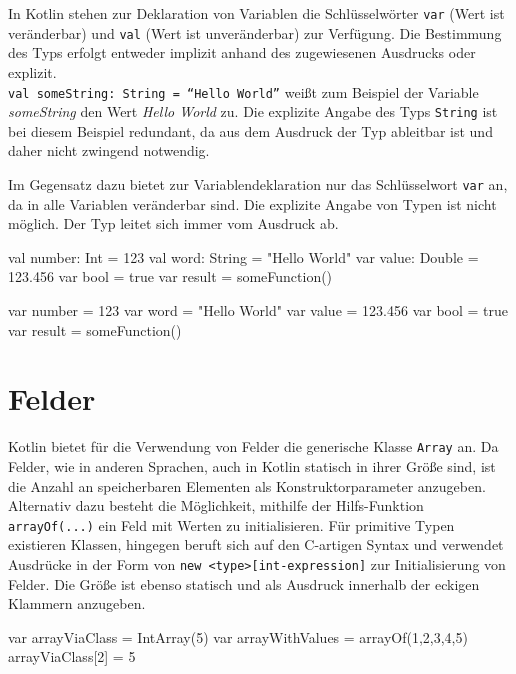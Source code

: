 In Kotlin stehen zur Deklaration von Variablen die Schlüsselwörter \texttt{var} (Wert ist veränderbar) und \texttt{val} (Wert ist unveränderbar) zur Verfügung. Die Bestimmung des Typs erfolgt entweder implizit anhand des zugewiesenen Ausdrucks oder explizit.\\ \texttt{val someString: String = ``Hello World''} weißt zum Beispiel der Variable \textit{someString} den Wert \textit{Hello World} zu. Die explizite Angabe des Typs \texttt{String} ist bei diesem Beispiel redundant, da aus dem Ausdruck der Typ ableitbar ist und daher nicht zwingend notwendig.

Im Gegensatz dazu bietet \toya zur Variablendeklaration nur das Schlüsselwort \texttt{var} an, da in \toya alle Variablen veränderbar sind. Die explizite Angabe von Typen ist nicht möglich. Der Typ leitet sich immer vom Ausdruck ab.

\begin{KotlinCode}[numbers=none, caption={Variablendeklarationen in Kotlin}]
val number: Int = 123
val word: String = "Hello World"
var value: Double = 123.456
var bool = true
var result = someFunction()
\end{KotlinCode}

\begin{ToyaCode}[numbers=none, caption={Variablendeklarationen in \toya}]
var number = 123
var word = "Hello World"
var value = 123.456
var bool = true
var result = someFunction()
\end{ToyaCode}

\section{Felder}

Kotlin bietet für die Verwendung von Felder die generische Klasse \texttt{Array} an. Da Felder, wie in anderen Sprachen, auch in Kotlin statisch in ihrer Größe sind, ist die Anzahl an speicherbaren Elementen als Konstruktorparameter anzugeben. Alternativ dazu besteht die Möglichkeit, mithilfe der Hilfs-Funktion \texttt{arrayOf(...)} ein Feld mit Werten zu initialisieren. Für primitive Typen existieren Klassen, \toya hingegen beruft sich auf den C-artigen Syntax und verwendet Ausdrücke in der Form von \texttt{new <type>[int-expression]} zur Initialisierung von Felder. Die Größe ist ebenso statisch und als Ausdruck innerhalb der eckigen Klammern anzugeben.

\begin{KotlinCode}[numbers=none, caption={Felder in Kotlin}]
var arrayViaClass = IntArray(5)
var arrayWithValues = arrayOf(1,2,3,4,5)
arrayViaClass[2] = 5
\end{KotlinCode}

